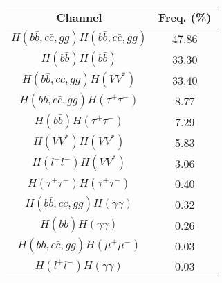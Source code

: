 \begin{tabular}{c|c}
  Channel & Freq. (\%) \\
\hline
$H(b\bar{b},c\bar{c},gg)H(b\bar{b},c\bar{c},gg)$ & 47.86 \\
\hline
$H(b\bar{b})H(b\bar{b})$ & 33.30 \\
\hline
$H(b\bar{b},c\bar{c},gg)H(VV^{*})$ & 33.40 \\
\hline
$H(b\bar{b},c\bar{c},gg)H(\tau^{+}\tau^{-})$ & 8.77    \\
\hline
$H(b\bar{b})H(\tau^{+}\tau^{-})$ & 7.29    \\
\hline
$H(VV^*)H(VV^{*})$ & 5.83  \\
\hline
$H(l^{+}l^{-})H(VV^{*})$ & 3.06   \\
\hline
$H(\tau^{+}\tau^{-})H(\tau^{+}\tau^{-})$ & 0.40 \\
\hline
$H(b\bar{b},c\bar{c},gg)H(\gamma\gamma)$ & 0.32   \\
\hline
$H(b\bar{b})H(\gamma\gamma)$ & 0.26   \\
\hline
$H(b\bar{b},c\bar{c},gg)H(\mu^{+}\mu^{-})$ & 0.03   \\
\hline
$H(l^{+}l^{-})H(\gamma\gamma)$ & 0.03   \\
\end{tabular}
